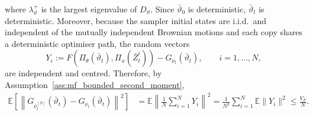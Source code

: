 
where \(\lambda_\vartheta^+\) is the largest eigenvalue of \(D_\vartheta\).
Since \(\bar\vartheta_0\) is deterministic, \(\bar\vartheta_t\) is
deterministic. Moreover, because the sampler initial states are i.i.d.\ and
independent of the mutually independent Brownian motions and each copy shares a deterministic optimiser path, the random vectors
\[
    Y_i
    :=
    F(\Pi_\theta(\bar\vartheta_t),\Pi_x(\bar Z_t^i))
    -
    G_{\bar\nu_t}(\bar\vartheta_t),
    \qquad i=1,\ldots,N,
\]
are independent and centred. Therefore, by
Assumption~\ref{ass:mf_bounded_second_moment},
\begin{align*}
    \mathbb E
    \left[
    \left\|
    G_{\bar\nu_t^{[N]}}(\bar\vartheta_t)
    -
    G_{\bar\nu_t}(\bar\vartheta_t)
    \right\|^2
    \right]
    &=
    \mathbb E\left\|\frac1N\sum_{i=1}^NY_i\right\|^2=
    \frac1{N^2}\sum_{i=1}^N\mathbb E\|Y_i\|^2
    \le
    \frac{V_F}{N}.
\end{align*}
